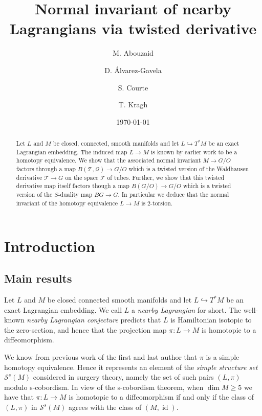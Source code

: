 \documentclass[reqno]{amsart}
\author{M. Abouzaid \and D. \'Alvarez-Gavela \and S. Courte \and T. Kragh}
\title{Normal invariant of nearby Lagrangians via twisted derivative} %
\date{\today} \thanks{}
\theoremstyle{theorem}
\theoremstyle{remark}
\theoremstyle{definition}
\newcommand{\T}{\mathcal{T}}
\newcommand{\QQ}{\mathcal{Q}}
\renewcommand{\SS}{\mathcal{S}}
\DeclareMathOperator{\id}{id}
\begin{document}
\maketitle


 \begin{abstract}
Let $L$ and $M$ be closed, connected, smooth manifolds and let $L \hookrightarrow T^*M$ be an exact Lagrangian embedding. The induced map $L \to M$ is known by earlier work to be a homotopy equivalence. We show that the associated normal invariant $M \to G/O$ factors through a map $B(\T,\QQ) \to G/O$ which is a twisted version of the Waldhausen derivative $\T \to G$ on the space $\T$ of tubes. Further, we show that this twisted derivative map itself factors though a map $B(G/O) \to G/O$ which is a twisted version of the $S$-duality map $BG \to G$. In particular we deduce that the normal invariant of the homotopy equivalence $L \to M$ is 2-torsion. \end{abstract}
 
 
 
\tableofcontents


\section{Introduction}\label{sec:intro}


\subsection{Main results}


Let $L$ and $M$ be closed connected smooth manifolds and let $L \hookrightarrow T^*M$ be an exact Lagrangian embedding.
We call $L$ a \emph{nearby Lagrangian} for short. The well-known \emph{nearby Lagrangian conjecture}
predicts that $L$ is Hamiltonian isotopic to the zero-section, and hence that the projection map
$\pi\colon L \to M$ is homotopic to a diffeomorphism.


We know from previous work of the first and last author
that $\pi$ is a simple homotopy equivalence. Hence it represents an element of the
\emph{simple structure set} $\SS^s(M)$ considered in surgery theory, namely
the set of such pairs $(L,\pi)$ modulo s-cobordism.  In view of the s-cobordism theorem, when $\dim M \geq 5$ we have that $\pi \colon L \to M$ is homotopic to a diffeomorphism if and only if
the class of $(L,\pi)$ in $\SS^s(M)$ agrees with the class of $(M,\id)$. 
\end{document}
